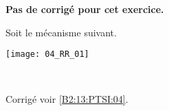 \normaltrue
\correctionfalse


\setcounter{numques}{0}
\ifcorrection
\else
\textbf{Pas de corrigé pour cet exercice.}
\fi

\ifprof
\else
Soit le mécanisme suivant. 
\begin{center}
\texttt{[image: 04\_RR\_01]}
\end{center}
\fi

\ifprof~\\
\else
\fi



\ifprof
\else
\begin{flushright}
\footnotesize{Corrigé  voir \ref{B2:13:PTSI:04}.}
\end{flushright}%
\fi